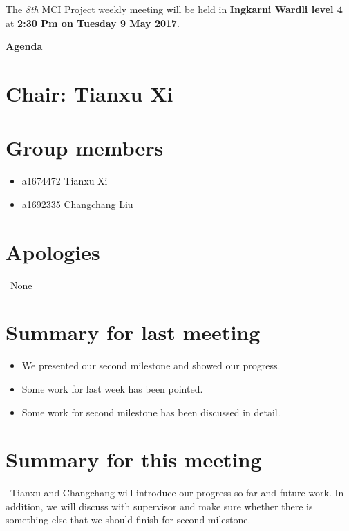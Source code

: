 \documentclass[11pt, a4paper]{article}
\begin{document}
\noindent The {\em 8th} MCI Project weekly meeting will be held in {\bf Ingkarni Wardli level 4} at {\bf 2:30 Pm on Tuesday 9 May 2017}.


\vspace*{15pt}

\begin{center}
\huge \bf Agenda
\end{center}



\section*{Chair: Tianxu Xi           }
\section{Group members}
\begin{itemize}
	\item a1674472  Tianxu Xi
	\item a1692335 Changchang Liu
\end{itemize}

\section{Apologies}
\ None \\


\section{Summary for last meeting}
\begin {itemize} 
\item We presented our second milestone and showed our progress.
\item Some work for last week has been pointed.
\item Some work for second milestone has been discussed in detail.
\end {itemize}


\section{Summary for this meeting}
\ Tianxu and Changchang will introduce our progress so far and future work. In addition, we will discuss with supervisor and make sure whether there is something else that we should finish for second milestone. \\
\end{document}
